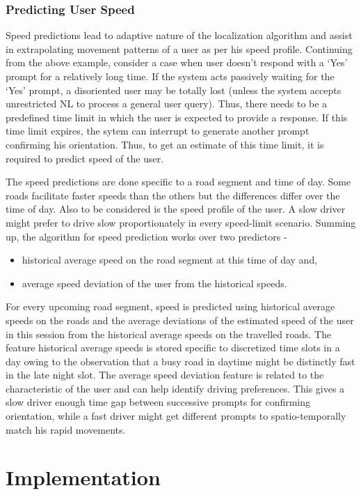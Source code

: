 \documentclass{iitkthesis}
\begin{document}
\subsection{Predicting User Speed}
Speed predictions lead to adaptive nature of the localization algorithm and assist in extrapolating movement patterns of a user as per his speed profile. Continuing from the above example, consider a case when user doesn't respond with a `Yes' prompt for a relatively long time. If the system acts passively waiting for the `Yes' prompt, a disoriented user may be totally lost (unless the system accepts unrestricted NL to process a general user query). Thus, there needs to be a predefined time limit in which the user is expected to provide a response. If this time limit expires, the sytem can interrupt to generate another prompt confirming his orientation. Thus, to get an estimate of this time limit, it is required to predict speed of the user. 

The speed predictions are done specific to a road segment and time of day. Some roads facilitate faster speeds than the others but the differences differ over the time of day.
Also to be considered is the speed profile of the user. A slow driver might prefer to drive slow proportionately in every speed-limit scenario. Summing up, the algorithm for speed prediction works over two predictors - 
\begin{itemize}
\item historical average speed on the road segment at this time of day and,
\item average speed deviation of the user from the historical speeds.
\end{itemize}

For every upcoming road segment, speed is predicted using historical average speeds on the roads and the average deviations of the estimated speed of the user in this session from the historical average speeds on the travelled roads. The feature historical average speeds is stored specific to discretized time slots in a day owing to the observation that a busy road in daytime might be distinctly fast in the late night slot. The average speed deviation feature is related to the characteristic of the user and can help identify driving preferences. This gives a slow driver enough time gap between successive prompts for confirming orientation, while a fast driver might get different prompts to spatio-temporally match his rapid movements.
 \chapter{Implementation}
\end{document}
